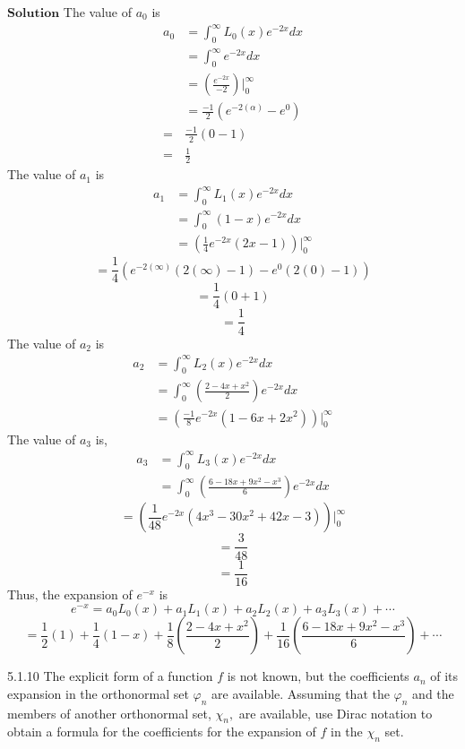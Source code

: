 $\boxed{\textbf{Solution}}$ The value of $a_0$ is
$$
\begin{aligned}
a_{0} &=\int_{0}^{\infty} L_{0}(x) e^{-2 x} d x \\
&=\int_{0}^{\infty} e^{-2 x} d x \\
&=\left(\frac{e^{-2 x}}{-2}\right)\Bigg|_{0}^{\infty} \\
&=\frac{-1}{2}\left(e^{-2(\alpha)}-e^{0}\right) \\
=& \frac{-1}{2}(0-1) \\
=& \frac{1}{2}
\end{aligned}
$$
The value of $a_1$ is
$$
\begin{aligned}
a_{1} &=\int_{0}^{\infty} L_{1}(x) e^{-2 x} d x \\
&=\int_{0}^{\infty}(1-x) e^{-2 x} d x \\
&=\left(\frac{1}{4} e^{-2 x}(2 x-1)\right)\Bigg|_{0}^{\infty}
\end{aligned}
$$
$$
=\frac{1}{4}\left(e^{-2(\infty)}(2(\infty)-1)-e^{0}(2(0)-1)\right)
$$
$$=\frac{1}{4}(0+1)$$
$$=\frac{1}{4}$$
The value of $a_2$ is
$$
\begin{aligned}
a_{2} &=\int_{0}^{\infty} L_{2}(x) e^{-2 x} d x \\
&=\int_{0}^{\infty}\left(\frac{2-4 x+x^{2}}{2}\right) e^{-2 x} d x \\
&=\left(\frac{-1}{8} e^{-2 x}\left(1-6 x+2 x^{2}\right)\right)\Bigg|_{0}^{\infty}
\end{aligned}
$$
The value of $a_{3}$ is,
$$
\begin{aligned}
a_{3} &=\int_{0}^{\infty} L_{3}(x) e^{-2 x} d x \\
&=\int_{0}^{\infty}\left(\frac{6-18 x+9 x^{2}-x^{3}}{6}\right) e^{-2 x} d x
\end{aligned}
$$
$$
=\left(\frac{1}{48} e^{-2 x}\left(4 x^{3}-30 x^{2}+42 x-3\right)\right)\Bigg|_{0}^{\infty}
$$
$$=\frac{3}{48}$$
$$=\frac{1}{16}$$
Thus, the expansion of $e^{-x}$ is
$$
e^{-x}=a_{0} L_{0}(x)+a_{1} L_{1}(x)+a_{2} L_{2}(x)+a_{3} L_{3}(x)+\cdots
$$
$$
=\frac{1}{2}(1)+\frac{1}{4}(1-x)+\frac{1}{8}\left(\frac{2-4 x+x^{2}}{2}\right)+\frac{1}{16}\left(\frac{6-18 x+9 x^{2}-x^{3}}{6}\right)+\cdots
$$

\newpage

\begin{mybox}{5.1.10}
The explicit form of a function $f$ is not known, but the coefficients $a_{n}$ of its expansion in the orthonormal set $\varphi_{n}$ are available. Assuming that the $\varphi_{n}$ and the members of another orthonormal set, $\chi_{n},$ are available, use Dirac notation to obtain a formula for the coefficients for the expansion of $f$ in the $\chi_{n}$ set.
\end{mybox}

